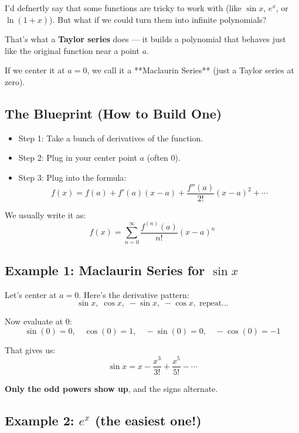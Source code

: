 \documentclass{article}
\begin{document}
\begin{tcolorbox}[colback=gray!8,colframe=black,title=Big Idea – Rewriting Functions as Polynomials]
I'd defnertly say that some functions are tricky to work with (like \( \sin x \), \( e^x \), or \( \ln(1 + x) \)). But what if we could turn them into infinite polynomials?

That’s what a \textbf{Taylor series} does — it builds a polynomial that behaves just like the original function near a point \( a \).

If we center it at \( a = 0 \), we call it a **Maclaurin Series** (just a Taylor series at zero).
\end{tcolorbox}

\subsection*{The Blueprint (How to Build One)}

\begin{itemize}
  \item Step 1: Take a bunch of derivatives of the function.
  \item Step 2: Plug in your center point \( a \) (often 0).
  \item Step 3: Plug into the formula:
  \[
  f(x) = f(a) + f'(a)(x - a) + \frac{f''(a)}{2!}(x - a)^2 + \cdots
  \]
\end{itemize}

\vspace{4pt}
\noindent
We usually write it as:
\[
\boxed{
f(x) = \sum_{n=0}^{\infty} \frac{f^{(n)}(a)}{n!}(x-a)^n
}
\]

\subsection*{Example 1: Maclaurin Series for \( \sin x \)}

Let’s center at \( a = 0 \). Here’s the derivative pattern:
\[
\sin x,\; \cos x,\; -\sin x,\; -\cos x,\; \text{repeat...}
\]

Now evaluate at 0:
\[
\sin(0)=0,\quad \cos(0)=1,\quad -\sin(0)=0,\quad -\cos(0)=-1
\]

That gives us:
\[
\sin x = x - \frac{x^3}{3!} + \frac{x^5}{5!} - \cdots
\]

 \textbf{Only the odd powers show up}, and the signs alternate.

\subsection*{Example 2: \( e^x \) (the easiest one!)}
\end{document}
